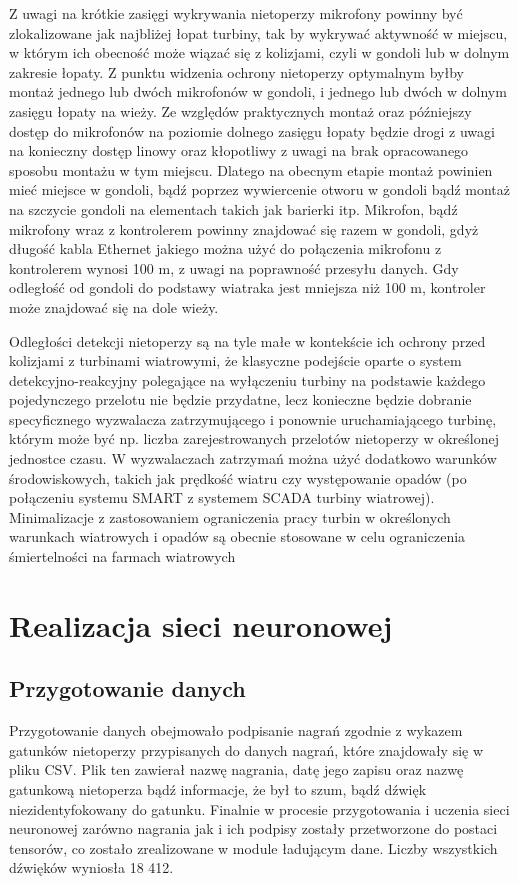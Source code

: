 \documentclass{sprz}
\begin{document}
Z uwagi na krótkie zasięgi wykrywania nietoperzy mikrofony powinny być zlokalizowane jak najbliżej łopat turbiny, tak by wykrywać aktywność w miejscu, w którym ich obecność może wiązać się z kolizjami, czyli w gondoli lub w dolnym zakresie łopaty. Z punktu widzenia ochrony nietoperzy optymalnym byłby montaż jednego lub dwóch mikrofonów w gondoli, i jednego lub dwóch w dolnym zasięgu łopaty na wieży. Ze względów praktycznych montaż oraz późniejszy dostęp do mikrofonów na poziomie dolnego zasięgu łopaty będzie drogi z uwagi na konieczny dostęp linowy oraz kłopotliwy z uwagi na brak opracowanego sposobu montażu w tym miejscu. Dlatego na obecnym etapie montaż powinien mieć miejsce w gondoli, bądź poprzez wywiercenie otworu w gondoli bądź montaż na szczycie gondoli na elementach takich jak barierki itp.
Mikrofon, bądź mikrofony wraz z kontrolerem powinny znajdować się razem w gondoli, gdyż długość kabla Ethernet jakiego można użyć do połączenia mikrofonu z kontrolerem wynosi 100 m, z uwagi na poprawność przesyłu danych. Gdy odległość od gondoli do podstawy wiatraka jest mniejsza niż 100 m, kontroler może znajdować się na dole wieży.

Odległości detekcji nietoperzy są na tyle małe w kontekście ich ochrony przed kolizjami z turbinami wiatrowymi, że klasyczne podejście oparte o system detekcyjno-reakcyjny polegające na wyłączeniu turbiny na podstawie każdego pojedynczego przelotu nie będzie przydatne, lecz konieczne będzie dobranie specyficznego wyzwalacza zatrzymującego i ponownie uruchamiającego turbinę, którym może być np. liczba zarejestrowanych przelotów nietoperzy w określonej jednostce czasu. W wyzwalaczach zatrzymań można użyć dodatkowo warunków środowiskowych, takich jak prędkość wiatru czy występowanie opadów (po połączeniu systemu SMART z systemem SCADA turbiny wiatrowej). Minimalizacje z zastosowaniem ograniczenia pracy turbin w określonych warunkach wiatrowych i opadów są obecnie stosowane w celu ograniczenia śmiertelności na farmach wiatrowych \cite{Wytyczne}

\chapter{Realizacja sieci neuronowej}

\section{Przygotowanie danych}
Przygotowanie danych obejmowało podpisanie nagrań zgodnie z wykazem gatunków nietoperzy przypisanych do danych nagrań, które znajdowały się w pliku CSV. Plik ten zawierał nazwę nagrania, datę jego zapisu oraz nazwę gatunkową nietoperza bądź informacje, że był to szum, bądź dźwięk niezidentyfokowany do gatunku. Finalnie w procesie przygotowania i uczenia sieci neuronowej zarówno nagrania jak i ich podpisy zostały przetworzone do postaci tensorów, co zostało zrealizowane w module ładującym dane. Liczby wszystkich dźwięków wyniosła 18 412.
\end{document}
